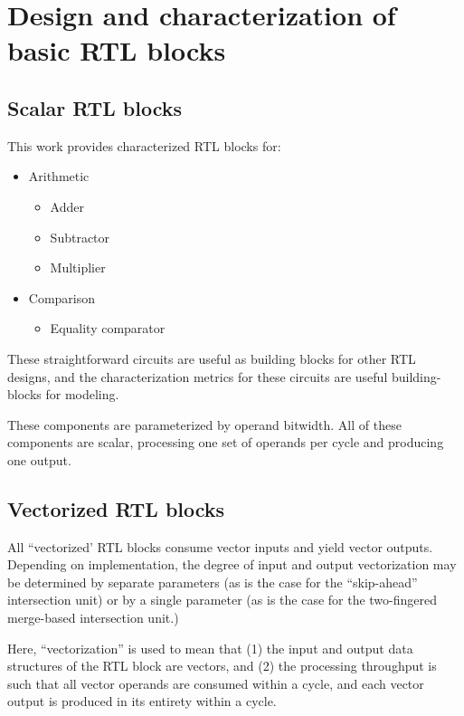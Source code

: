 \chapter{Design and characterization of basic RTL blocks}
\label{chapter:rtl}

\section{Scalar RTL blocks}

This work provides characterized RTL blocks for:

\begin{itemize}
    \item Arithmetic

    \begin{itemize}
        \item Adder
        \item Subtractor
        \item Multiplier
    \end{itemize}
    
    \item Comparison

    \begin{itemize}
        \item Equality comparator
    \end{itemize}
\end{itemize}

These straightforward circuits are useful as building blocks for other RTL designs, and the characterization metrics for these circuits are useful building-blocks for modeling.

These components are parameterized by operand bitwidth. All of these components are scalar, processing one set of operands per cycle and producing one output.

\section{Vectorized RTL blocks}

All ``vectorized' RTL blocks consume vector inputs and yield vector outputs. Depending on implementation, the degree of input and output vectorization may be determined by separate parameters (as is the case for the ``skip-ahead'' intersection unit) or by a single parameter (as is the case for the two-fingered merge-based intersection unit.)

Here, ``vectorization'' is used to mean that (1) the input and output data structures of the RTL block are vectors, and (2) the processing throughput is such that all vector operands are consumed within a cycle, and each vector output is produced in its entirety within a cycle.

